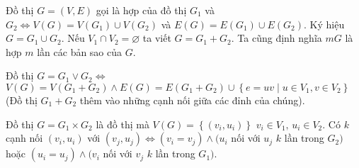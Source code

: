 \begin{definition}
	 Đồ thị $G = (V,E)$ gọi là hợp của đồ thị $G_1$ và $G_2 \iff V(G) = V(G_1) \cup V(G_2)$ và $E(G) = E(G_1) \cup E(G_2)$. Ký hiệu $G = G_1\cup G_2$. Nếu $V_1 \cap V_2 = \varnothing$ ta viết $G = G_1 + G_2$. Ta cũng định nghĩa $mG$ là hợp $m$ lần các bản sao của $G$.
\end{definition}
\begin{definition}
	 Đồ thị $G = G_1 \lor G_2 \iff$ $V(G) = V(G_1 + G_2) \land E(G) = E(G_1 +G_2) \cup \left\{e=uv\mid u \in V_1, v \in V_2\right\}$ (Đồ thị $G_1 +G_2$ thêm vào những cạnh nối giữa các đỉnh của chúng).
\end{definition}


\begin{definition}
	 Đồ thị $G = G_1 \times G_2$ là đồ thị mà $V(G) = \left\{(v_i,u_i)\right\}$ $v_i \in V_1,\, u_i \in V_2$. Có $k$ cạnh nối $(v_i,u_i)$ với $(v_j,u_j) \iff {(v_i = v_j)} \land (u_i $ nối với $u_j$ $k$ lần  trong $G_2)$ hoặc ${(u_i = u_j)} \land (v_i $ nối với $v_j$ $k$ lần  trong $G_1)$.
\end{definition}

